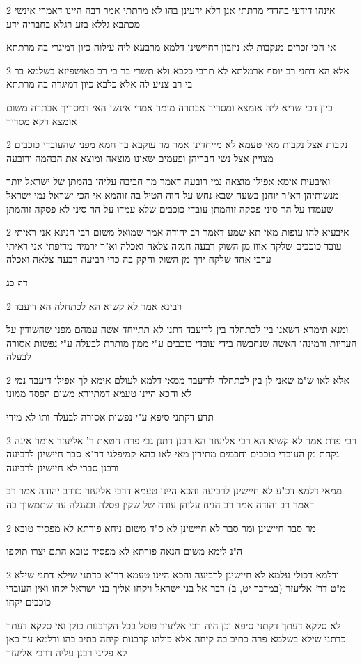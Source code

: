\documentclass[12pt, openany]{book}
\newcommand{\sethebfont}{
\fontsize{10.5pt}{21.0pt} \selectfont
}
\newcommand{\twocol}[1]{
	{\sethebfont \begin{multicols}{2}
			#1
	\end{multicols}}	
}
\newcommand{\sectname}{}
\newcommand{\newsection}[1]{
	\addcontentsline{toc}{section}{#1}
	\renewcommand{\sectname}{#1}	
	\vspace{-\baselineskip}
	\begin{center}
		\textbf{%
\fontsize{16pt}{16pt}\selectfont
			#1}
	\end{center}
	\vspace{-\baselineskip}
	\nopagebreak
}
\begin{document}
\twocol{אינהו דידעי בהדדי מרתתי אנן דלא ידעינן בהו לא מרתתי אמר רבה היינו דאמרי אינשי מכתבא גללא בזע רגלא בחבריה ידע
\par אי הכי זכרים מנקבות לא ניזבון דחיישינן דלמא מרבעא ליה עילוה כיון דמיגרי בה מרתתא}
\twocol{אלא הא דתני רב יוסף ארמלתא לא תרבי כלבא ולא תשרי בר בי רב באושפיזא בשלמא בר בי רב צניע לה אלא כלבא כיון דמיגרה בה מרתתא
\par כיון דכי שדיא ליה אומצא ומסריך אבתרה מימר אמרי אינשי האי דמסריך אבתרה משום אומצא דקא מסריך}
\twocol{נקבות אצל נקבות מאי טעמא לא מייחדינן אמר מר עוקבא בר חמא מפני שהעובדי כוכבים מצויין אצל נשי חבריהן ופעמים שאינו מוצאה ומוצא את הבהמה ורובעה
\par ואיבעית אימא אפילו מוצאה נמי רובעה דאמר מר חביבה עליהן בהמתן של ישראל יותר מנשותיהן דא"ר יוחנן בשעה שבא נחש על חוה הטיל בה זוהמא אי הכי ישראל נמי ישראל שעמדו על הר סיני פסקה זוהמתן עובדי כוכבים שלא עמדו על הר סיני לא פסקה זוהמתן}
\twocol{איבעיא להו עופות מאי תא שמע דאמר רב יהודה אמר שמואל משום רבי חנינא אני ראיתי עובד כוכבים שלקח אווז מן השוק רבעה חנקה צלאה ואכלה וא"ר ירמיה מדיפתי אני ראיתי ערבי אחד שלקח ירך מן השוק וחקק בה כדי רביעה רבעה צלאה ואכלה}
\newsection{דף כג}
\twocol{רבינא אמר לא קשיא הא לכתחלה הא דיעבד
\par ומנא תימרא דשאני בין לכתחלה בין לדיעבד דתנן לא תתייחד אשה עמהם מפני שחשודין על העריות ורמינהו האשה שנחבשה בידי עובדי כוכבים ע"י ממון מותרת לבעלה ע"י נפשות אסורה לבעלה}
\twocol{אלא לאו ש"מ שאני לן בין לכתחלה לדיעבד ממאי דלמא לעולם אימא לך אפילו דיעבד נמי לא והכא היינו טעמא דמתיירא משום הפסד ממונו
\par תדע דקתני סיפא ע"י נפשות אסורה לבעלה ותו לא מידי}
\twocol{רבי פדת אמר לא קשיא הא רבי אליעזר הא רבנן דתנן גבי פרת חטאת ר' אליעזר אומר אינה נקחת מן העובדי כוכבים וחכמים מתירין מאי לאו בהא קמיפלגי דר"א סבר חיישינן לרביעה ורבנן סברי לא חיישינן לרביעה
\par ממאי דלמא דכ"ע לא חיישינן לרביעה והכא היינו טעמא דרבי אליעזר כדרב יהודה אמר רב דאמר רב יהודה אמר רב הניח עליהן עודה של שקין פסלה ובעגלה עד שתמשוך בה}
\twocol{מר סבר חיישינן ומר סבר לא חיישינן לא ס"ד משום ניחא פורתא לא מפסיד טובא
\par ה"נ לימא משום הנאה פורתא לא מפסיד טובא התם יצרו תוקפו}
\twocol{ודלמא דכולי עלמא לא חיישינן לרביעה והכא היינו טעמא דר"א כדתני שילא דתני שילא מ"ט דר' אליעזר (במדבר יט, ב) דבר אל בני ישראל ויקחו אליך בני ישראל יקחו ואין העובדי כוכבים יקחו
\par לא סלקא דעתך דקתני סיפא וכן היה רבי אליעזר פוסל בכל הקרבנות כולן ואי סלקא דעתך כדתני שילא בשלמא פרה כתיב בה קיחה אלא כולהו קרבנות קיחה כתיב בהו ודלמא עד כאן לא פליגי רבנן עליה דרבי אליעזר}
\end{document}

